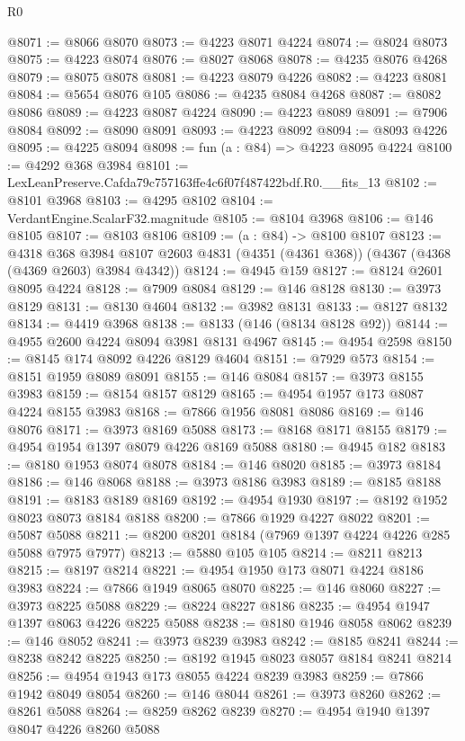 \begin{lexlean}{R0}
\begin{coremodule}
@8071 := @8066 @8070
@8073 := @4223 @8071 @4224
@8074 := @8024 @8073
@8075 := @4223 @8074
@8076 := @8027 @8068
@8078 := @4235 @8076 @4268
@8079 := @8075 @8078
@8081 := @4223 @8079 @4226
@8082 := @4223 @8081
@8084 := @5654 @8076 @105
@8086 := @4235 @8084 @4268
@8087 := @8082 @8086
@8089 := @4223 @8087 @4224
@8090 := @4223 @8089
@8091 := @7906 @8084
@8092 := @8090 @8091
@8093 := @4223 @8092
@8094 := @8093 @4226
@8095 := @4225 @8094
@8098 := fun (a : @84) => @4223 @8095 @4224
@8100 := @4292 @368 @3984
@8101 := LexLeanPreserve.Cafda79c757163ffe4c6f07f487422bdf.R0.__fits_13
@8102 := @8101 @3968
@8103 := @4295 @8102
@8104 := VerdantEngine.ScalarF32.magnitude
@8105 := @8104 @3968
@8106 := @146 @8105
@8107 := @8103 @8106
@8109 := (a : @84) -> @8100 @8107
@8123 := @4318
    @368
    @3984
    @8107
    @2603
    @4831
    (@4351 (@4361 @368))
    (@4367 (@4368 (@4369 @2603) @3984 @4342))
@8124 := @4945 @159
@8127 := @8124 @2601 @8095 @4224
@8128 := @7909 @8084
@8129 := @146 @8128
@8130 := @3973 @8129
@8131 := @8130 @4604
@8132 := @3982 @8131
@8133 := @8127 @8132
@8134 := @4419 @3968
@8138 := @8133 (@146 (@8134 @8128 @92))
@8144 := @4955 @2600 @4224 @8094 @3981 @8131 @4967
@8145 := @4954 @2598
@8150 := @8145 @174 @8092 @4226 @8129 @4604
@8151 := @7929 @573
@8154 := @8151 @1959 @8089 @8091
@8155 := @146 @8084
@8157 := @3973 @8155 @3983
@8159 := @8154 @8157 @8129
@8165 := @4954 @1957 @173 @8087 @4224 @8155 @3983
@8168 := @7866 @1956 @8081 @8086
@8169 := @146 @8076
@8171 := @3973 @8169 @5088
@8173 := @8168 @8171 @8155
@8179 := @4954 @1954 @1397 @8079 @4226 @8169 @5088
@8180 := @4945 @182
@8183 := @8180 @1953 @8074 @8078
@8184 := @146 @8020
@8185 := @3973 @8184
@8186 := @146 @8068
@8188 := @3973 @8186 @3983
@8189 := @8185 @8188
@8191 := @8183 @8189 @8169
@8192 := @4954 @1930
@8197 := @8192 @1952 @8023 @8073 @8184 @8188
@8200 := @7866 @1929 @4227 @8022
@8201 := @5087 @5088
@8211 := @8200 @8201 @8184 (@7969 @1397 @4224 @4226 @285 @5088 @7975 @7977)
@8213 := @5880 @105 @105
@8214 := @8211 @8213
@8215 := @8197 @8214
@8221 := @4954 @1950 @173 @8071 @4224 @8186 @3983
@8224 := @7866 @1949 @8065 @8070
@8225 := @146 @8060
@8227 := @3973 @8225 @5088
@8229 := @8224 @8227 @8186
@8235 := @4954 @1947 @1397 @8063 @4226 @8225 @5088
@8238 := @8180 @1946 @8058 @8062
@8239 := @146 @8052
@8241 := @3973 @8239 @3983
@8242 := @8185 @8241
@8244 := @8238 @8242 @8225
@8250 := @8192 @1945 @8023 @8057 @8184 @8241 @8214
@8256 := @4954 @1943 @173 @8055 @4224 @8239 @3983
@8259 := @7866 @1942 @8049 @8054
@8260 := @146 @8044
@8261 := @3973 @8260
@8262 := @8261 @5088
@8264 := @8259 @8262 @8239
@8270 := @4954 @1940 @1397 @8047 @4226 @8260 @5088

\end{coremodule}
\end{lexlean}
